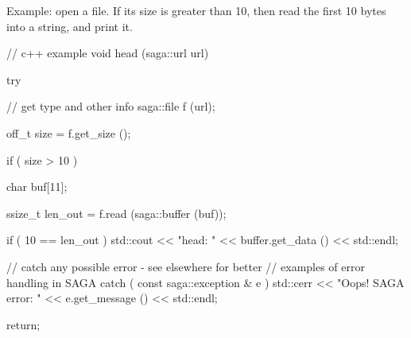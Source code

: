   Example: open a file. If its size is greater than 10, then
  read the first 10 bytes into a string, and print it.
 
 \begin{mycode}
   // c++ example
   void head (saga::url url)
   {
     try {
       // get type and other info
       saga::file f (url);
 
       off_t size = f.get_size ();
 
       if ( size > 10 )
       {
         char   buf[11];
 
         ssize_t len_out = f.read (saga::buffer (buf));
 
         if ( 10 == len_out )
         {
           std::cout << "head: "
                     << buffer.get_data ()
                     << std::endl;
         }
       }
     }
 
     // catch any possible error - see elsewhere for better
     // examples of error handling in SAGA
     catch ( const saga::exception & e )
     {
       std::cerr << "Oops! SAGA error: " 
                 << e.get_message () 
                 << std::endl;
     }
 
     return;
   }
 \end{mycode}
 
 
 
 
 

